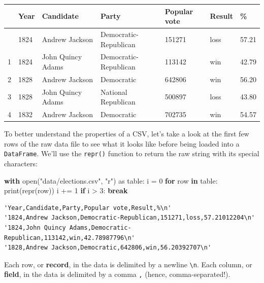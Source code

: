 \documentclass[
  letterpaper,
  DIV=11,
  numbers=noendperiod]{scrreprt}
\newenvironment{Shaded}{\begin{snugshade}}{\end{snugshade}}
\newcommand{\BuiltInTok}[1]{\textcolor[rgb]{0.00,0.23,0.31}{#1}}
\newcommand{\ControlFlowTok}[1]{\textcolor[rgb]{0.00,0.23,0.31}{\textbf{#1}}}
\newcommand{\DecValTok}[1]{\textcolor[rgb]{0.68,0.00,0.00}{#1}}
\newcommand{\ImportTok}[1]{\textcolor[rgb]{0.00,0.46,0.62}{#1}}
\newcommand{\KeywordTok}[1]{\textcolor[rgb]{0.00,0.23,0.31}{\textbf{#1}}}
\newcommand{\NormalTok}[1]{\textcolor[rgb]{0.00,0.23,0.31}{#1}}
\newcommand{\OperatorTok}[1]{\textcolor[rgb]{0.37,0.37,0.37}{#1}}
\newcommand{\StringTok}[1]{\textcolor[rgb]{0.13,0.47,0.30}{#1}}
\begin{document}
\begin{longtable}[]{@{}lllllll@{}}
\toprule\noalign{}
& Year & Candidate & Party & Popular vote & Result & \% \\
\midrule\noalign{}
\endhead
\bottomrule\noalign{}
\endlastfoot
0 & 1824 & Andrew Jackson & Democratic-Republican & 151271 & loss &
57.21 \\
1 & 1824 & John Quincy Adams & Democratic-Republican & 113142 & win &
42.79 \\
2 & 1828 & Andrew Jackson & Democratic & 642806 & win & 56.20 \\
3 & 1828 & John Quincy Adams & National Republican & 500897 & loss &
43.80 \\
4 & 1832 & Andrew Jackson & Democratic & 702735 & win & 54.57 \\
\end{longtable}

To better understand the properties of a CSV, let's take a look at the
first few rows of the raw data file to see what it looks like before
being loaded into a \texttt{DataFrame}. We'll use the \texttt{repr()}
function to return the raw string with its special characters:

\begin{Shaded}
\begin{Highlighting}[]
\ControlFlowTok{with} \BuiltInTok{open}\NormalTok{(}\StringTok{"data/elections.csv"}\NormalTok{, }\StringTok{"r"}\NormalTok{) }\ImportTok{as}\NormalTok{ table:}
\NormalTok{    i }\OperatorTok{=} \DecValTok{0}
    \ControlFlowTok{for}\NormalTok{ row }\KeywordTok{in}\NormalTok{ table:}
        \BuiltInTok{print}\NormalTok{(}\BuiltInTok{repr}\NormalTok{(row))}
\NormalTok{        i }\OperatorTok{+=} \DecValTok{1}
        \ControlFlowTok{if}\NormalTok{ i }\OperatorTok{\textgreater{}} \DecValTok{3}\NormalTok{:}
            \ControlFlowTok{break}
\end{Highlighting}
\end{Shaded}

\begin{verbatim}
'Year,Candidate,Party,Popular vote,Result,%\n'
'1824,Andrew Jackson,Democratic-Republican,151271,loss,57.21012204\n'
'1824,John Quincy Adams,Democratic-Republican,113142,win,42.78987796\n'
'1828,Andrew Jackson,Democratic,642806,win,56.20392707\n'
\end{verbatim}

Each row, or \textbf{record}, in the data is delimited by a newline
\texttt{\textbackslash{}n}. Each column, or \textbf{field}, in the data
is delimited by a comma \texttt{,} (hence, comma-separated!).
\end{document}
